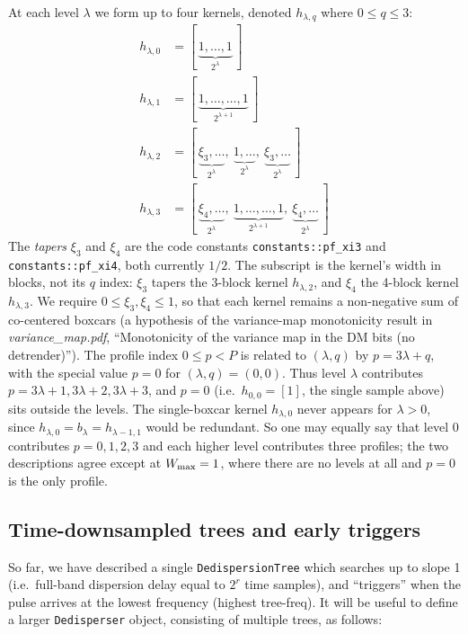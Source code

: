 \documentclass{article}
\numberwithin{equation}{section}   %
\def\nn{\nonumber}
\newcommand{\vmnotes}[1]{{\em variance\_map.pdf}, ``#1''}
\begin{document}
At each level $\lambda$ we form up to four kernels, denoted $h_{\lambda,q}$ where $0\le q \le 3$:
\begin{align}
h_{\lambda,0} &= [\,\underbrace{1,\dots,1}_{2^\lambda}\,] \nn \\
h_{\lambda,1} &= [\,\underbrace{1,\dots,\dots,1}_{2^{\lambda+1}}\,] \nn \\
h_{\lambda,2} &= [\,\underbrace{\xi_3,\dots}_{2^\lambda},\ \underbrace{1,\dots}_{2^\lambda},\ \underbrace{\xi_3,\dots}_{2^\lambda}\,] \nn \\
h_{\lambda,3} &= [\,\underbrace{\xi_4,\dots}_{2^\lambda},\ \underbrace{1,\dots,\dots,1}_{2^{\lambda+1}},\ \underbrace{\xi_4,\dots}_{2^\lambda}\,]
\end{align}
The {\em tapers} $\xi_3$ and $\xi_4$ are the code constants {\tt constants::pf\_xi3} and
{\tt constants::pf\_xi4}, both currently $1/2$. The subscript is the kernel's width in blocks,
not its $q$ index: $\xi_3$ tapers the 3-block kernel $h_{\lambda,2}$, and $\xi_4$ the 4-block
kernel $h_{\lambda,3}$. We require $0 \le \xi_3, \xi_4 \le 1$, so that each kernel remains a
non-negative sum of co-centered boxcars (a hypothesis of the variance-map monotonicity result
in \vmnotes{Monotonicity of the variance map in the DM bits (no detrender)}).
The profile index $0\le p < P$ is related to $(\lambda,q)$ by $p = 3\lambda + q$, with the special value $p = 0$ for
$(\lambda,q) = (0,0)$. Thus level $\lambda$ contributes $p = 3\lambda+1, 3\lambda+2, 3\lambda+3$, and $p=0$ (i.e.\
$h_{0,0} = [1]$, the single sample above) sits outside the levels. The single-boxcar kernel $h_{\lambda,0}$ never
appears for $\lambda > 0$, since $h_{\lambda,0} = b_\lambda = h_{\lambda-1,1}$ would be redundant. So one may equally
say that level $0$ contributes $p=0,1,2,3$ and each higher level contributes three profiles; the two descriptions
agree except at $W_{\rm max}=1$, where there are no levels at all and $p=0$ is the only profile.

\subsection{Time-downsampled trees and early triggers}
\label{sec:downsampled_early}

So far, we have described a single {\tt DedispersionTree} which searches up to slope 1 (i.e.~full-band dispersion delay equal to $2^r$ time samples), and ``triggers'' when the pulse arrives at the lowest frequency (highest tree-freq).
It will be useful to define a larger {\tt Dedisperser} object, consisting of multiple trees, as follows:
\end{document}
